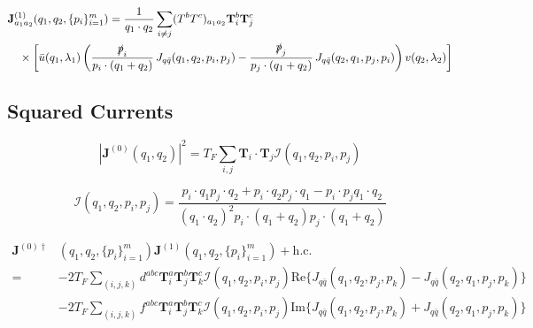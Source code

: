 \documentclass[a4paper,11pt]{article}
\begin{document}
\begin{equation}
\begin{split}
 &\mathbf{J}^{(1)}_{a_1 a_2}(q_1,q_2, \{ p_i \}_{i=1}^m ) =  \frac{1}{q_1 \cdot q_2} \sum_{i\neq j} (T^bT^c)_{a_1a_2} \mathbf{T}^b_i \mathbf{T}^c_j \, \\
  & \quad \times \left[ \bar{u}(q_1,\lambda_1) \left( \frac{\slashed{p}_i}{p_i \cdot (q_1 + q_2)} \, J_{q\bar{q}}(q_1,q_2, p_i, p_j)  - \frac{\slashed{p}_j}{p_j \cdot (q_1 + q_2)} \, J_{q\bar{q}}(q_2,q_1, p_j, p_i) \right) v(q_2,\lambda_2) \right] 
\end{split}
\end{equation}

\subsection{Squared Currents}
\begin{equation}
|\mathbf{J}^{(0)}(q_1, q_2)|^2 = T_F \sum_{i, j} \mathbf{T}_i \cdot \mathbf{T}_j \mathcal{I}(q_1, q_2, p_i, p_j)
\end{equation}

\begin{equation}
\mathcal{I}(q_1, q_2, p_i, p_j) = \frac{p_i \cdot q_1 p_j \cdot q_2 + p_i \cdot q_2 p_j \cdot q_1 - p_i \cdot p_j q_1 \cdot q_2}{(q_1 \cdot q_2)^2 p_i \cdot (q_1 + q_2) p_j \cdot (q_1 + q_2)}
\end{equation}

\begin{equation}
\begin{split}
\mathbf{J}^{(0)\dagger}&(q_1, q_2,\{ p_i \}_{i=1}^m ) \mathbf{J}^{(1)}(q_1, q_2, \{ p_i \}_{i=1}^m ) + \text{h.c.} \\ 
 = &-2T_F \sum_{(i,j,k)} d^{abc} \mathbf{T}_i^a \mathbf{T}_j^b \mathbf{T}_k^c \mathcal{I}(q_1, q_2, p_i, p_j) \text{Re} \big \lbrace J_{q\bar{q}} (q_1, q_2, p_j, p_k) - J_{q \bar{q}}(q_2, q_1, p_j, p_k)  \big \rbrace  \\ 
&  -2T_F \sum_{(i,j,k)} f^{abc} \mathbf{T}_i^a \mathbf{T}_j^b \mathbf{T}_k^c \mathcal{I}(q_1, q_2, p_i, p_j) \text{Im} \big \lbrace J_{q\bar{q}} (q_1, q_2, p_j, p_k) + J_{q \bar{q}}(q_2, q_1, p_j, p_k)  \big \rbrace  \\ 
\end{split}
\end{equation}
\end{document}
